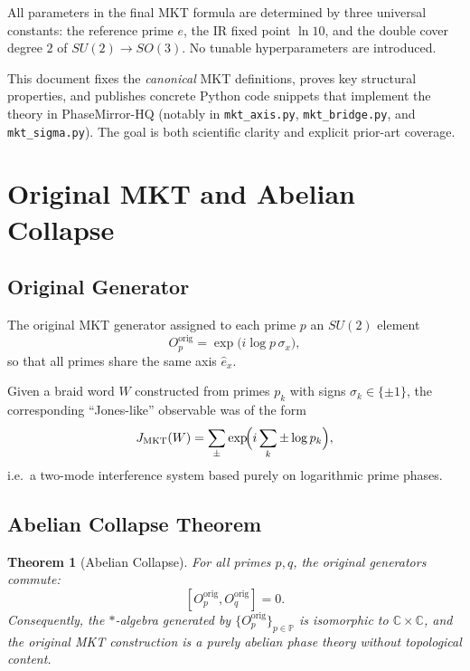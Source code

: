 \documentclass[11pt]{article}
\newtheorem{theorem}{Theorem}[section]
\theoremstyle{remark}
\begin{document}
All parameters in the final MKT formula are determined by three universal constants:
the reference prime $e$, the IR fixed point $\ln 10$, and the double cover
degree $2$ of $SU(2)\to SO(3)$. No tunable hyperparameters are introduced.

This document fixes the \emph{canonical} MKT definitions, proves key structural
properties, and publishes concrete Python code snippets that implement the theory in
PhaseMirror-HQ (notably in \texttt{mkt\_axis.py}, \texttt{mkt\_bridge.py}, and
\texttt{mkt\_sigma.py}). The goal is both scientific clarity and explicit prior-art
coverage.

\section{Original MKT and Abelian Collapse}

\subsection{Original Generator}

The original MKT generator assigned to each prime $p$ an $SU(2)$ element
\begin{equation}
  O_p^{\text{orig}} = \exp\!\bigl(i \log p \, \sigma_x\bigr),
  \label{eq:orig-gen}
\end{equation}
so that all primes share the same axis $\hat{e}_x$.

Given a braid word $W$ constructed from primes $p_k$ with signs
$\sigma_k \in \{\pm 1\}$, the corresponding ``Jones-like'' observable was of the
form
\begin{equation}
  J_{\text{MKT}}(W) = \sum_{\pm}
  \exp\!\Bigl(i \sum_k \pm \log p_k\Bigr),
\end{equation}
i.e.\ a two-mode interference system based purely on logarithmic prime phases.

\subsection{Abelian Collapse Theorem}

\begin{theorem}[Abelian Collapse]
For all primes $p,q$, the original generators commute:
\[
  [O_p^{\text{orig}}, O_q^{\text{orig}}] = 0.
\]
Consequently, the $*$-algebra generated by $\{O_p^{\text{orig}}\}_{p\in\mathbb{P}}$
is isomorphic to $\mathbb{C}\times\mathbb{C}$, and the original MKT construction
is a purely abelian phase theory without topological content.
\end{theorem}
\end{document}

